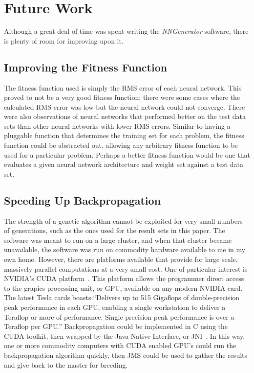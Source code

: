 \chapter[Future Work]{Future Work}
Although a great deal of time was spent writing the {\it NNGenerator}
software, there is plenty of room for improving upon it. 

\section{Improving the Fitness Function}
The fitness function used is simply the RMS error of each neural
network.
This proved to not be a very good fitness function; there were some
cases where the calculated RMS error was low but the neural network
could not converge.
There were also observations of neural networks that performed better
on the test data sets than other neural networks with lower RMS
errors.
Similar to having a pluggable function that determines the training
set for each problem, the fitness function could be abstracted out,
allowing any arbitrary fitness function to be used for a particular
problem.
Perhaps a better fitness function would be one that evaluates a given
neural network architecture and weight set against a test data set.

\section{Speeding Up Backpropagation}
The strength of a genetic algorithm cannot be exploited for very small
numbers of generations, such as the ones used for the result sets in
this paper.
The software was meant to run on a large cluster, and when that
cluster became unavailable, the software was run on commodity hardware
available to me in my own home.
However, there are platforms available that provide for large scale,
massively parallel computations at a very small cost.
One of particular interest is NVIDIA's CUDA platform~\cite{cuda,
  cuda1}.
This platform allows the programmer direct access to the grapics
processing unit, or GPU, available on any modern NVIDIA card.
The latest Tesla cards boasts:``Delivers up to 515 Gigaflops of
double-precision peak performance in each GPU, enabling a single
workstation to deliver a Teraflop or more of performance. Single
precision peak performance is over a Teraflop per GPU.''
Backpropagation could be implemented in C using the CUDA toolkit, then
wrapped by the Java Native Interface, or JNI~\cite{jni}.
In this way, one or more commodity computers with CUDA enabled GPU's
could run the backpropagation algorithm quickly, then JMS could be
used to gather the results and give back to the master for breeding.

